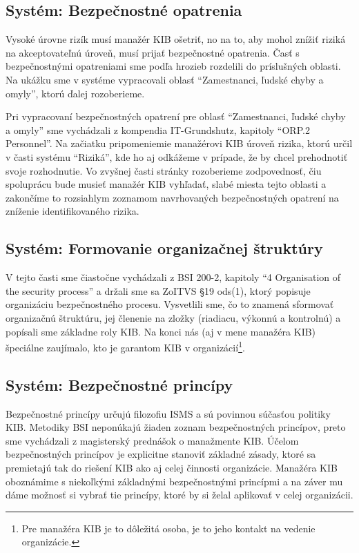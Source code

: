 \subsection*{Systém: Bezpečnostné opatrenia} 
Vysoké úrovne rizík musí manažér KIB ošetriť, no na to, aby mohol znížiť riziká na akceptovateľnú úroveň, musí prijať
bezpečnostné opatrenia. Časť s bezpečnostnými opatreniami sme podľa hrozieb rozdelili do príslušných oblasti. Na ukážku
sme v systéme vypracovali oblasť \enquote{Zamestnanci, ľudské chyby a omyly}, ktorú ďalej rozoberieme.

Pri vypracovaní bezpečnostných opatrení pre oblasť \enquote{Zamestnanci, ľudské chyby a omyly} sme vychádzali z kompendia
IT-Grundshutz\cite{GSK}, kapitoly \enquote{ORP.2 Personnel}. Na začiatku pripomeniemie manažérovi KIB úroveň rizika, ktorú
určil v časti systému \enquote{Riziká}, kde ho aj odkážeme v prípade, že by chcel prehodnotiť svoje rozhodnutie. Vo zvyšnej
časti stránky rozoberieme zodpovednosť, čiu spoluprácu bude musieť manažér KIB vyhľadať, slabé miesta tejto oblasti a
zakončíme to rozsiahlym zoznamom navrhovaných bezpečnostných opatrení na zníženie identifikovaného rizika.

\subsection*{Systém: Formovanie organizačnej štruktúry} 
V tejto časti sme čiastočne vychádzali z BSI 200-2\cite{BSI2}, kapitoly \enquote{4 Organisation of the security process} a
držali sme sa ZoITVS \S 19 ods(1), ktorý popisuje organizáciu bezpečnostného procesu. Vysvetlili sme, čo to znamená sformovať
organizačnú štruktúru, jej členenie na zložky (riadiacu, výkonnú a kontrolnú) a popísali sme základne roly KIB. Na konci
nás (aj v mene manažéra KIB) špeciálne zaujímalo, kto je garantom KIB v organizácií\footnote{Pre manažéra KIB je to
dôležitá osoba, je to jeho kontakt na vedenie organizácie.}.

\subsection*{Systém: Bezpečnostné princípy}
Bezpečnostné princípy určujú filozofiu ISMS a sú povinnou súčasťou politiky KIB. Metodiky BSI neponúkajú žiaden zoznam
bezpečnostných princípov, preto sme vychádzali z magisterský prednášok o manažmente KIB\cite{MngtKIB}. Účelom
bezpečnostných princípov je explicitne stanoviť základné zásady, ktoré sa premietajú tak do riešení KIB ako aj celej
činnosti organizácie. Manažéra KIB oboznámime s niekoľkými základnými bezpečnostnými princípmi a na záver mu dáme
možnosť si vybrať tie princípy, ktoré by si želal aplikovať v celej organizácii.

